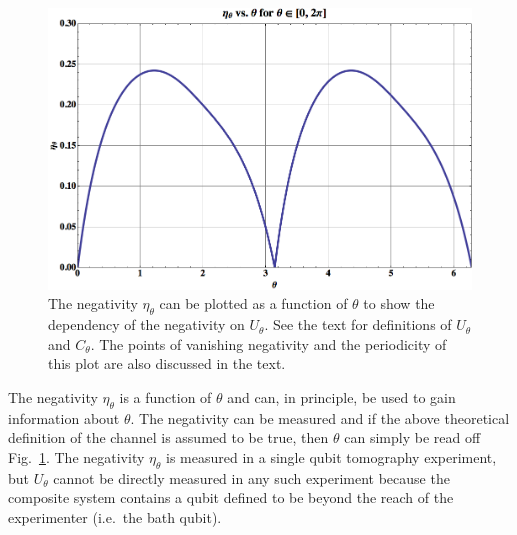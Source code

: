 \begin{figure}[h!t]
\centering
\includegraphics[scale=0.35]{etathetaII.png}
\caption{The negativity $\eta_\theta$ can be plotted as a function of $\theta$ to show the dependency of the negativity on $U_\theta$.  See the text for definitions of $U_\theta$ and $C_\theta$.  The points of vanishing negativity and the periodicity of this plot are also discussed in the text. }
\label{fig:etatheta}
\end{figure}

The negativity $\eta_\theta$ is a function of $\theta$ and can, in principle, be used to gain information about $\theta$.  The negativity can be measured and if the above theoretical definition of the channel is assumed to be true, then $\theta$ can simply be read off Fig.\ \ref{fig:etatheta}.  The negativity $\eta_\theta$ is measured in a single qubit tomography experiment, but $U_\theta$ cannot be directly measured in any such experiment because the composite system contains a qubit defined to be beyond the reach of the experimenter (i.e.\ the bath qubit).   

